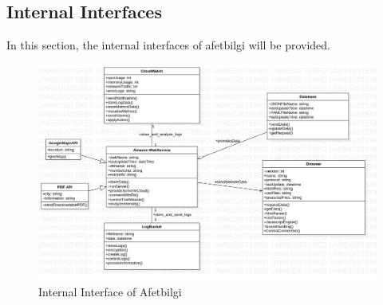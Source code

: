\subsection{Internal Interfaces}

In this section, the internal interfaces of afetbilgi will be provided. \\

\begin{figure}[H]
    \includegraphics[scale = 0.4]{assets/InternalInterfaces.png}
    \caption[Internal Interface of Afetbilgi]{Internal Interface of Afetbilgi}
\end{figure}

